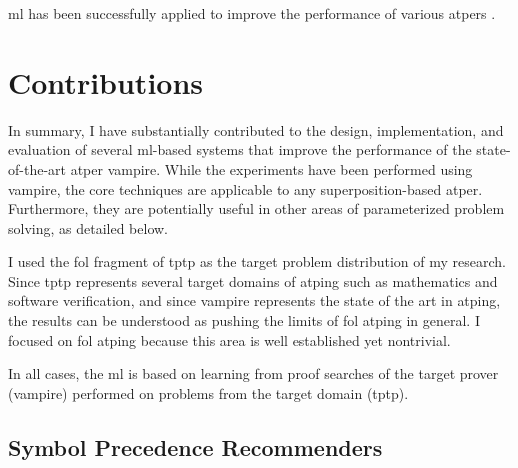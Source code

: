 \Gls{ml} has been successfully applied to improve the performance of various \glspl{atper} \cite{DBLP:journals/corr/abs-2403-04017}.



\section{Contributions}

In summary, I have substantially contributed to the design, implementation, and evaluation of several \acrshort{ml}-based systems that improve the performance of the state-of-the-art \gls{atper} \gls{vampire}.
While the experiments have been performed using \gls{vampire},
the core techniques are applicable to any \gls{superposition}-based \gls{atper}.
Furthermore, they are potentially useful in other areas of parameterized problem solving, as detailed below.

I used the \gls{fol} fragment of \gls{tptp} as the target problem distribution of my research.
Since \gls{tptp} represents several target domains of \gls{atping}
such as mathematics and software verification,
and since \gls{vampire} represents the state of the art in \gls{atping},
the results can be understood as pushing the limits of \gls{fol} \gls{atping} in general.
I focused on \gls{fol} \gls{atping} because this area is well established yet nontrivial.

In all cases, the \gls{ml} is based on learning from proof searches of the target prover (\gls{vampire}) performed on problems from the target domain (\gls{tptp}).

\subsection{Symbol Precedence Recommenders}
\label{sec:contrib:SymbolPrecedenceRecommenders}

